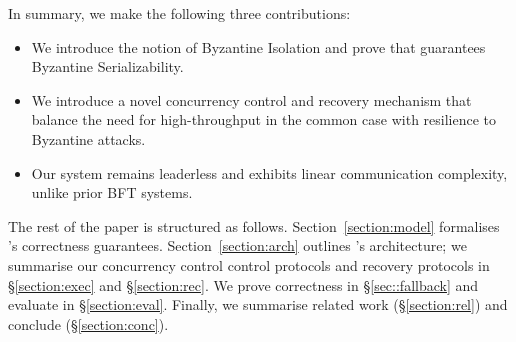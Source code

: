 
In summary, we make the following three contributions: 
\begin{itemize}
\item We introduce the notion of Byzantine Isolation and prove that \sys guarantees
Byzantine Serializability.
\item We introduce a novel concurrency control and recovery  mechanism that balance the need for high-throughput in
the common case with resilience to Byzantine attacks.
\item Our system remains leaderless and exhibits linear communication complexity, unlike prior BFT systems. 
\end{itemize}


The rest of the paper is structured as follows. Section~\ref{section:model} formalises \sys{}'s correctness guarantees.
Section~\ref{section:arch} outlines
\sys's architecture; we summarise our concurrency control control protocols and recovery protocols in \S\ref{section:exec} and \S\ref{section:rec}. We
prove correctness in \S\ref{sec::fallback} and evaluate \sys in \S\ref{section:eval}. Finally, we summarise related work (\S\ref{section:rel}) and conclude (\S\ref{section:conc}).

